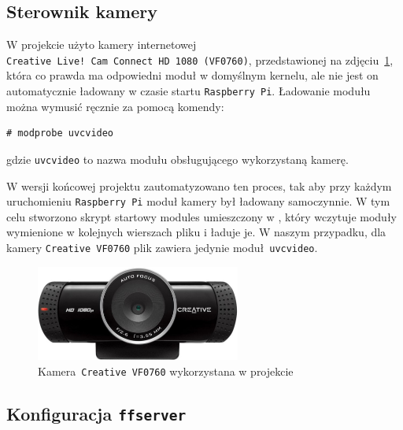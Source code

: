 \documentclass{article}
\begin{document}

\subsection{Sterownik kamery}

W projekcie użyto kamery internetowej \texttt{Creative~Live!~Cam~Connect~HD~1080~(VF0760)}, przedstawionej na zdjęciu~\ref{fig:creative}, która co prawda ma odpowiedni moduł w domyślnym kernelu, ale nie jest on automatycznie ładowany w czasie startu \texttt{Raspberry~Pi}. Ładowanie modułu można wymusić ręcznie za pomocą komendy:
\begin{verbatim}
# modprobe uvcvideo
\end{verbatim}
gdzie \texttt{uvcvideo} to nazwa modułu obsługującego wykorzystaną kamerę. 

W wersji końcowej projektu zautomatyzowano ten proces, tak aby przy każdym uruchomieniu \texttt{Raspberry~Pi} moduł kamery był ładowany samoczynnie. W tym celu stworzono skrypt startowy modules umieszczony w , który wczytuje moduły wymienione w kolejnych wierszach pliku  i ładuje je. W naszym przypadku, dla kamery \texttt{Creative~VF0760} plik zawiera jedynie moduł~\texttt{uvcvideo}.
\begin{figure}[h]
	\renewcommand\figurename{Zdjęcie}
	\centering
	\includegraphics[width=0.6\textwidth]{img/creative}
	\caption{Kamera~\texttt{Creative~VF0760} wykorzystana w projekcie}
	\label{fig:creative}
\end{figure}


\subsection{Konfiguracja \texttt{ffserver}}
\end{document}
